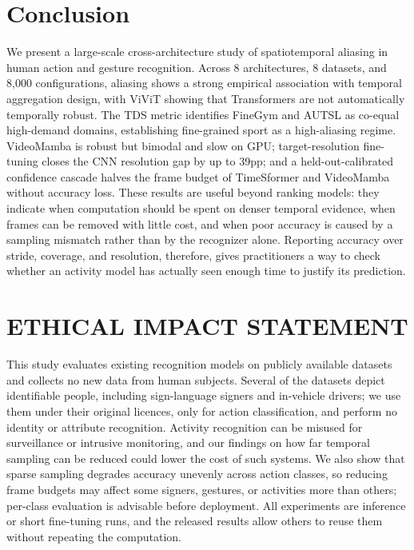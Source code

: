 \documentclass[a4paper, 10pt, conference]{ieeeconf}
\newcommand{\TDS}{\textsc{TDS}}
\begin{document}
\section{Conclusion}
\label{sec:conclusion}

We present a large-scale cross-architecture study of spatiotemporal aliasing in human action and gesture recognition. Across 8 architectures, 8 datasets, and 8,000 configurations, aliasing shows a strong empirical association with temporal aggregation design, with ViViT showing that Transformers are not automatically temporally robust. The \TDS{} metric identifies FineGym and AUTSL as co-equal high-demand domains, establishing fine-grained sport as a high-aliasing regime. VideoMamba is robust but bimodal and slow on GPU; target-resolution fine-tuning closes the CNN resolution gap by up to 39pp; and a held-out-calibrated confidence cascade halves the frame budget of TimeSformer and VideoMamba without accuracy loss. These results are useful beyond ranking models: they indicate when computation should be spent on denser temporal evidence, when frames can be removed with little cost, and when poor accuracy is caused by a sampling mismatch rather than by the recognizer alone. Reporting accuracy over stride, coverage, and resolution, therefore, gives practitioners a way to check whether an activity model has actually seen enough time to justify its prediction.

\section*{ETHICAL IMPACT STATEMENT}
This study evaluates existing recognition models on publicly available datasets and collects no new data from human subjects. Several of the datasets depict identifiable people, including sign-language signers and in-vehicle drivers; we use them under their original licences, only for action classification, and perform no identity or attribute recognition. Activity recognition can be misused for surveillance or intrusive monitoring, and our findings on how far temporal sampling can be reduced could lower the cost of such systems. We also show that sparse sampling degrades accuracy unevenly across action classes, so reducing frame budgets may affect some signers, gestures, or activities more than others; per-class evaluation is advisable before deployment. All experiments are inference or short fine-tuning runs, and the released results allow others to reuse them without repeating the computation.

{\small


}
\end{document}
